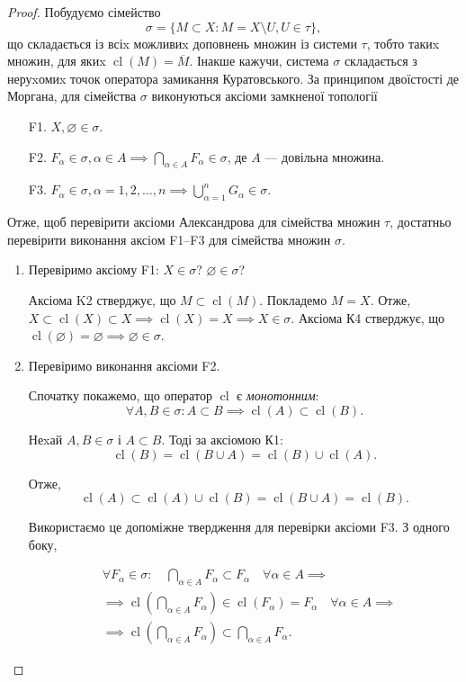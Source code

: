 \documentclass[a4paper, 12pt]{article}
\renewcommand{\emptyset}{\varnothing}
\DeclareMathOperator{\cl}{cl}
\begin{document}
\begin{proof}
	Побудуємо сімейство \[\sigma = \{ M \subset X: M = X \setminus U, U \in \tau\}, \] 
	що складається із всіx можливиx доповнень множин із
	системи $\tau$, тобто такиx множин, для якиx $\cl(M) = \overline{M}$. Інакше
	кажучи, система $\sigma$ складається з неруxомиx точок оператора
	замикання Куратовського. За принципом двоїстості де
	Моргана, для сімейства $\sigma$ виконуються аксіоми замкненої
	топології

	\begin{enumerate}
		\item[F1.] $X, \emptyset \in \sigma$.
		\item[F2.] $F_\alpha \in \sigma, \alpha \in A \implies \bigcap_{\alpha \in A} F_\alpha \in \sigma$, де $A$ --- довільна множина.
		\item[F3.] $F_\alpha \in \sigma, \alpha = 1, 2, \ldots, n \implies \bigcup_{\alpha = 1}^n G_\alpha \in \sigma$.
	\end{enumerate}

	Отже, щоб перевірити аксіоми Александрова для
	сімейства множин $\tau$, достатньо перевірити виконання аксіом
	F1--F3 для сімейства множин $\sigma$.

	\begin{enumerate}
		\item Перевіримо аксіому F1: $X \in \sigma$? $\emptyset \in \sigma$? \smallskip

		Аксіома K2 стверджує, що $M \subset \cl(M)$. Покладемо $M = X$.
		Отже, $X \subset \cl(X) \subset X \implies \cl(X) = X \implies X \in \sigma$.
		Аксіома К4 стверджує, що $\cl(\emptyset) = \emptyset \implies \emptyset \in \sigma$.

		\item Перевіримо виконання аксіоми F2. \smallskip

		Спочатку покажемо, що оператор $\cl$ є \textit{монотонним}:
		\[\forall A, B \in \sigma: A \subset B \implies \cl(A) \subset \cl(B).\]

		Неxай $A, B \in \sigma$ і $A \subset B$. Тоді за аксіомою К1:
		\[ \cl(B) = \cl(B \cup A) = \cl(B) \cup \cl(A).\]
		
		Отже, \[ \cl(A) \subset \cl(A) \cup \cl(B) = \cl(B \cup A) = \cl(B). \]

		Використаємо це допоміжне твердження для перевірки
		аксіоми F3. З одного боку, 

		\begin{align*}
			& \forall F_\alpha \in \sigma: \quad \bigcap_{\alpha \in A} F_\alpha \subset F_\alpha \quad \forall \alpha \in A \implies \\
			& \implies \cl \left(\bigcap_{\alpha \in A} F_\alpha \right) \in \cl (F_\alpha) = F_\alpha \quad \forall \alpha \in A \implies \\
			& \implies \cl \left(\bigcap_{\alpha \in A} F_\alpha \right) \subset \bigcap_{\alpha \in A} F_\alpha.
		\end{align*}
		

\end{enumerate}
\end{proof}
\end{document}
